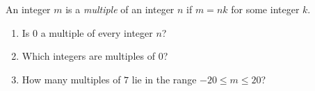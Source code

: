 An integer $m$ is a \emph{multiple} of an integer $n$ if $m=nk$ for some integer $k$.
\begin{enumerate}
\item[(a)] Is $0$ a multiple of every integer $n$?
\item[(b)] Which integers are multiples of $0$?
\item[(c)] How many multiples of $7$ lie in the range $-20\le m\le20$?
\end{enumerate}
